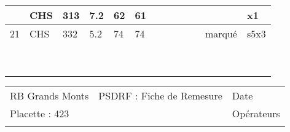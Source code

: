 \documentclass[a4paper, landscape]{article}\usepackage[]{graphicx}\usepackage[]{color}
\begin{document}
{\begin{tabular}{|p{1cm}|p{2cm}|p{1.6cm}|p{1.6cm}|p{1.6cm}|p{1.6cm}|p{1.5cm}|p{1.5cm}|p{1.5cm}|p{1.5cm}|p{1.5cm}|p{7.5cm}|p{5cm}|}
   \rowcolor[gray]{0.95} \hline
20 & CHS & 313 & 7.2 & 62 & 61 &  &  &  &  &  &  & x1 \\ 
   \hline
21 & CHS & 332 & 5.2 & 74 & 74 &  &  &  &  &  & marqué & s5x3 \\ 
   \rowcolor[gray]{0.95} \hline
 &  &  &  &  &  &  &  &  &  &  &  &  \\ 
   \hline
 &  &  &  &  &  &  &  &  &  &  &  &  \\ 
   \rowcolor[gray]{0.95} \hline
 &  &  &  &  &  &  &  &  &  &  &  &  \\ 
   \hline
 &  &  &  &  &  &  &  &  &  &  &  &  \\ 
   \rowcolor[gray]{0.95} \hline
 &  &  &  &  &  &  &  &  &  &  &  &  \\ 
   \hline
 &  &  &  &  &  &  &  &  &  &  &  &  \\ 
   \rowcolor[gray]{0.95} \hline
 &  &  &  &  &  &  &  &  &  &  &  &  \\ 
   \hline
 &  &  &  &  &  &  &  &  &  &  &  &  \\ 
   \rowcolor[gray]{0.95} \hline
 &  &  &  &  &  &  &  &  &  &  &  &  \\ 
   \hline
\end{tabular}
}

\begin{tabular}{p{10cm}p{10cm}p{8cm}}
  RB Grands Monts & PSDRF : Fiche de Remesure & Date \\ 
  Placette : 423 &  & Opérateurs \\ 
   &  &  \\ 
  \end{tabular}
\end{document}

